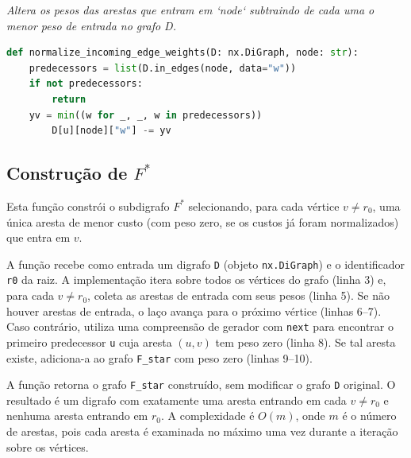 \begin{tcolorbox}[
        enhanced, breakable,
        colframe=blue!60!black, colback=blue!2,
        colbacktitle=blue!15, coltitle=black,
        title={Normalização por vértice: custos reduzidos},
        boxed title style={sharp corners, boxrule=0.6pt},
        sharp corners, boxrule=0.6pt
    ]
    \emph{Altera os pesos das arestas que entram em `node` subtraindo de cada uma o menor peso de entrada no grafo D.}
    \tcblower
    \begin{lstlisting}[language=Python]
def normalize_incoming_edge_weights(D: nx.DiGraph, node: str):    
    predecessors = list(D.in_edges(node, data="w"))
    if not predecessors:
        return
    yv = min((w for _, _, w in predecessors))
        D[u][node]["w"] -= yv   
\end{lstlisting}
\end{tcolorbox}


\subsection[Construção de F*]{Construção de $F^*$}
Esta função constrói o subdigrafo \(F^*\) selecionando, para cada vértice \(v\neq r_0\), uma única aresta de menor custo (com peso zero, se os custos já foram normalizados) que entra em \(v\).

A função recebe como entrada um digrafo \texttt{D} (objeto \texttt{nx.DiGraph}) e o identificador \texttt{r0} da raiz. A implementação itera sobre todos os vértices do grafo (linha 3) e, para cada \(v\neq r_0\), coleta as arestas de entrada com seus pesos (linha 5). Se não houver arestas de entrada, o laço avança para o próximo vértice (linhas 6--7). Caso contrário, utiliza uma compreensão de gerador com \texttt{next} para encontrar o primeiro predecessor \texttt{u} cuja aresta \((u,v)\) tem peso zero (linha 8). Se tal aresta existe, adiciona-a ao grafo \texttt{F\_star} com peso zero (linhas 9--10).

A função retorna o grafo \texttt{F\_star} construído, sem modificar o grafo \texttt{D} original. O resultado é um digrafo com exatamente uma aresta entrando em cada \(v\neq r_0\) e nenhuma aresta entrando em \(r_0\). A complexidade é \(O(m)\), onde \(m\) é o número de arestas, pois cada aresta é examinada no máximo uma vez durante a iteração sobre os vértices.


